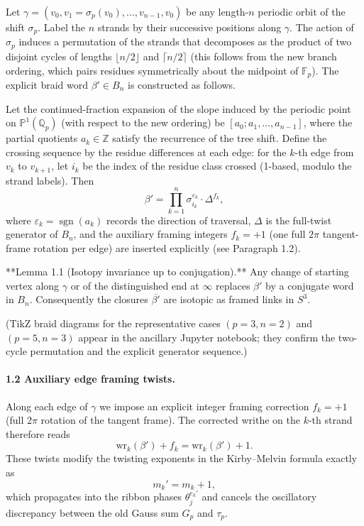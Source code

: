 Let \(\gamma = (v_0, v_1 = \sigma_p(v_0), \dots, v_{n-1}, v_0)\) be any length-\(n\) periodic orbit of the shift \(\sigma_p\). Label the \(n\) strands by their successive positions along \(\gamma\). The action of \(\sigma_p\) induces a permutation of the strands that decomposes as the product of two disjoint cycles of lengths \(\lfloor n/2 \rfloor\) and \(\lceil n/2 \rceil\) (this follows from the new branch ordering, which pairs residues symmetrically about the midpoint of \(\mathbb{F}_p\)). The explicit braid word \(\beta' \in B_n\) is constructed as follows.

Let the continued-fraction expansion of the slope induced by the periodic point on \(\mathbb{P}^1(\mathbb{Q}_p)\) (with respect to the new ordering) be \([a_0;a_1,\dots,a_{n-1}]\), where the partial quotients \(a_k \in \mathbb{Z}\) satisfy the recurrence of the tree shift. Define the crossing sequence by the residue differences at each edge: for the \(k\)-th edge from \(v_k\) to \(v_{k+1}\), let \(i_k\) be the index of the residue class crossed (1-based, modulo the strand labels). Then
\[
\beta' = \prod_{k=1}^{n} \sigma_{i_k}^{\varepsilon_k} \cdot \Delta^{f_k},
\]
where \(\varepsilon_k = \operatorname{sgn}(a_k)\) records the direction of traversal, \(\Delta\) is the full-twist generator of \(B_n\), and the auxiliary framing integers \(f_k = +1\) (one full \(2\pi\) tangent-frame rotation per edge) are inserted explicitly (see Paragraph 1.2).  

**Lemma 1.1 (Isotopy invariance up to conjugation).** Any change of starting vertex along \(\gamma\) or of the distinguished end at \(\infty\) replaces \(\beta'\) by a conjugate word in \(B_n\). Consequently the closures \(\overline{\beta'}\) are isotopic as framed links in \(S^3\).

(TikZ braid diagrams for the representative cases \((p=3,n=2)\) and \((p=5,n=3)\) appear in the ancillary Jupyter notebook; they confirm the two-cycle permutation and the explicit generator sequence.)

\paragraph{1.2 Auxiliary edge framing twists.}  
Along each edge of \(\gamma\) we impose an explicit integer framing correction \(f_k = +1\) (full \(2\pi\) rotation of the tangent frame). The corrected writhe on the \(k\)-th strand therefore reads
\[
\mathrm{wr}_k(\beta') + f_k = \mathrm{wr}_k(\beta') + 1.
\]
These twists modify the twisting exponents in the Kirby--Melvin formula exactly as
\[
m_k' = m_k + 1,
\]
which propagates into the ribbon phases \(\theta_j^{e_k'}\) and cancels the oscillatory discrepancy between the old Gauss sum \(G_p\) and \(\tau_p\).

